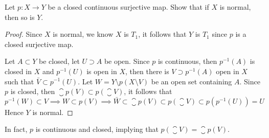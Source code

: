 \documentclass[12pt,a4paper]{article}
\begin{document}
    \begin{ex}
        Let $p:X\to Y$ be a closed continuous surjective map. Show that if $X$ is normal, then so is $Y$.
    \end{ex}
    \begin{proof}
        Since $X$ is normal, we know $X$ is $T_1$, it follows that $Y$ is $T_1$ since $p$ is a closed surjective map.
        
        Let $A\subset Y$ be closed, let $U\supset A$ be open. Since $p$ is continuous, then $p^{-1}(A)$ is closed in $X$ and $p^{-1}(U)$ is open in $X$, then there is $V\supset p^{-1}(A)$ open in $X$ such that $\bar{V}\subset p^{-1}(U)$. Let $W=Y\setminus p(X\setminus V)$ be an open set containing $A$. Since $p$ is closed, then $\closure{p(V)}\subset p(\closure{V})$, it follows that 
        $$
        p^{-1}(W)\subset V\implies W\subset p(V)\implies \bar{W}\subset\closure{p(V)}\subset p(\closure{V})\subset p(p^{-1}(U))=U
        $$
        Hence $Y$ is normal.        
    \end{proof}
    \begin{remark}
        In fact, $p$ is continuous and closed, implying that $p(\closure{V})=\closure{p(V)}$.
    \end{remark}
    \hfill
\end{document}
